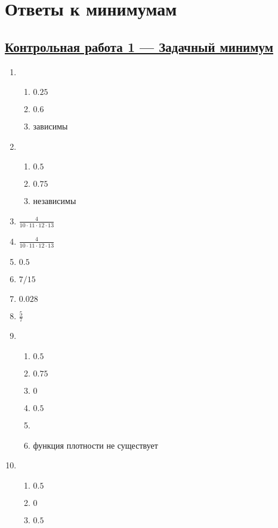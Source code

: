 \thispagestyle{empty}
\section{Ответы к минимумам}

\subsection[Кр 1]{\hyperref[sec:minimum_kr_01]{Контрольная работа 1 — Задачный минимум}}
\label{sec:sol_minimum_kr_01}



\begin{multicols}{2}
\begin{enumerate}
	\item
			\begin{enumerate}
				\item $0.25$
				\item $0.6$
				\item зависимы
			\end{enumerate}
	\item %
			\begin{enumerate}
				\item $0.5$
				\item $0.75$
				\item независимы
			\end{enumerate}
	\item $\frac{4}{10 \cdot 11 \cdot 12 \cdot 13}$
	\item $\frac{4}{10 \cdot 11 \cdot 12 \cdot 13}$
	\item $0.5$
	\item $7/15$
	\item $0.028$
	\item $\frac{5}{7}$
	\item %
			\begin{enumerate}
				\item $0.5$
				\item $0.75$
				\item $0$
				\item $0.5$
				\item
				\item функция плотности не существует
			\end{enumerate}
	\item %
			\begin{enumerate}
				\item $0.5$
				\item $0$
				\item $0.5$

\end{enumerate}
\end{enumerate}
\end{multicols}
